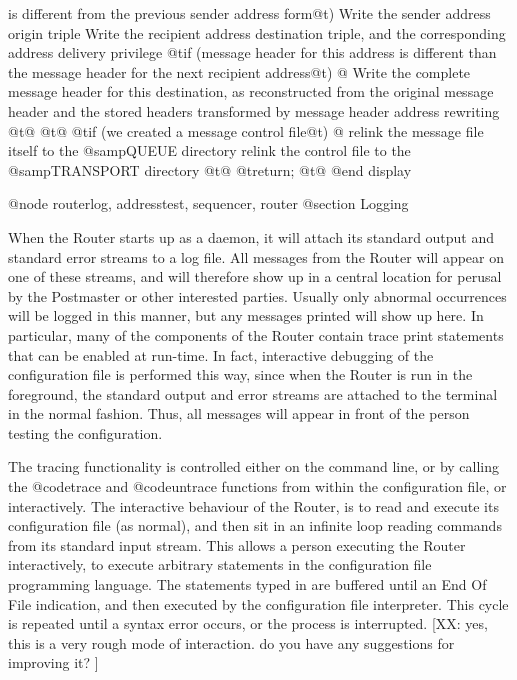 {{{{            is different from the previous sender address form@t{)}
            Write the sender address origin triple
        Write the recipient address destination triple, and the
            corresponding address delivery privilege
        @t{if (}message header for this address is different than
            the message header for the next recipient address@t{) @{}
            Write the complete message header for this destination,
                as reconstructed from the original message
                header and the stored headers transformed by
                message header address rewriting
        @t{@}}
    @t{@}}
    @t{if (}we created a message control file@t{) @{}
        relink the message file itself to the @samp{QUEUE} directory
        relink the control file to the @samp{TRANSPORT} directory
    @t{@}}
    @t{return;}
@t{@}}
@end display

@node routerlog, addresstest, sequencer, router
@section Logging

When the Router starts up as a daemon, it will attach its standard
output and standard error streams to a log file.
All messages from the Router will appear on one of these streams,
and will therefore show up in a central location for perusal by
the Postmaster or other interested parties.
Usually only abnormal occurrences will be logged in this manner,
but any messages printed will show up here.
In particular, many of the components of the Router contain trace
print statements that can be enabled at run-time.
In fact, interactive debugging of the configuration file is performed
this way, since when the Router is run in the foreground, the standard
output and error streams are attached to the terminal in the normal fashion.
Thus, all messages will appear in front of the person testing the
configuration.

The tracing functionality is controlled either on the command line,
or by calling the @code{trace} and @code{untrace} functions from within
the configuration file, or interactively.
The interactive behaviour of the Router, is to read and execute its
configuration file (as normal), and then sit in an infinite loop
reading commands from its standard input stream.
This allows a person executing the Router interactively, to execute
arbitrary statements in the configuration file programming language.
The statements typed in are buffered until an End Of File indication,
and then executed by the configuration file interpreter.
This cycle is repeated until a syntax error occurs, or the process
is interrupted.  [XX: yes, this is a very rough mode of
interaction. do you have any suggestions for improving it? ]

}}
